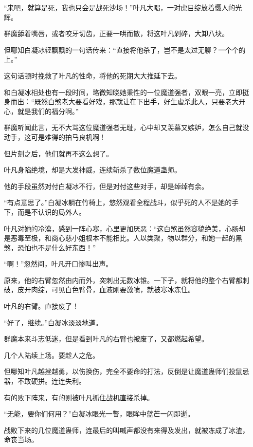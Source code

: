 
\begin{this_body}



“来吧，就算是死，我也只会是战死沙场！”叶凡大喝，一对虎目绽放着慑人的光辉。

群魔舔着嘴唇，或者咬牙切齿，正要一哄而散，将这叶凡剁碎，大卸八块。

但哪知白凝冰轻飘飘的一句话传来：“直接将他杀了，岂不是太过无聊？一个个的上。”

这句话顿时挽救了叶凡的性命，将他的死期大大推延下去。

和白凝冰相处也有一段时间，略微知晓她秉性的一位魔道强者，双眼一亮，立即挺身而出：“既然白煞老大要看好戏，那就让在下出手，好生虐杀此人，只要老大开心，就是我们的福分啊。”

群魔听闻此言，无不大骂这位魔道强者无耻，心中却又羡慕又嫉妒，怎么自己就没动手，这可是难得的拍马良机啊！

但片刻之后，他们就再不这么想了。

叶凡身陷绝境，却是大发神威，连续斩杀了数位魔道蛊师。

他的手段虽然对付白凝冰不行，但是对付这些对手，却是绰绰有余。

“有点意思了。”白凝冰躺在竹椅上，悠然观看全程战斗，似乎死的人不是她的手下，而是不认识的局外人。

叶凡对她的冷漠，感到一阵心寒，心里更加厌恶：“这白煞虽然容貌绝美，心肠却是恶毒至极，和商心慈小姐根本不能相比。人以类聚，物以群分，和她一起的黑煞，恐怕也不是什么好东西！”

“啊！”忽然间，叶凡开口惨叫出声。

原来，他的右臂忽然由内而外，突刺出无数冰锥。一下子，就将他的整个右臂都刺破，皮开肉绽，可见白色臂骨，血液刚要激喷，就被寒冰冻住。

叶凡的右臂。直接废了！

“好了，继续。”白凝冰淡淡地道。

群魔本来斗志低迷，但是看到叶凡的右臂也被废了，又都燃起希望。

几个人陆续上场。要趁人之危。

但哪知叶凡越挫越勇，以伤换伤，完全不要命的打法，反倒是让魔道蛊师们投鼠忌器，不敢硬拼。连连失利。

有的败下阵来，有的则被叶凡抓住战机直接杀掉。

“无能，要你们何用？”白凝冰眼光一瞥，眼眸中蓝芒一闪即逝。

战败下来的几位魔道蛊师，连最后的叫喊声都没有来得及发出，就被冻成了冰渣，命丧当场。


\end{this_body}
